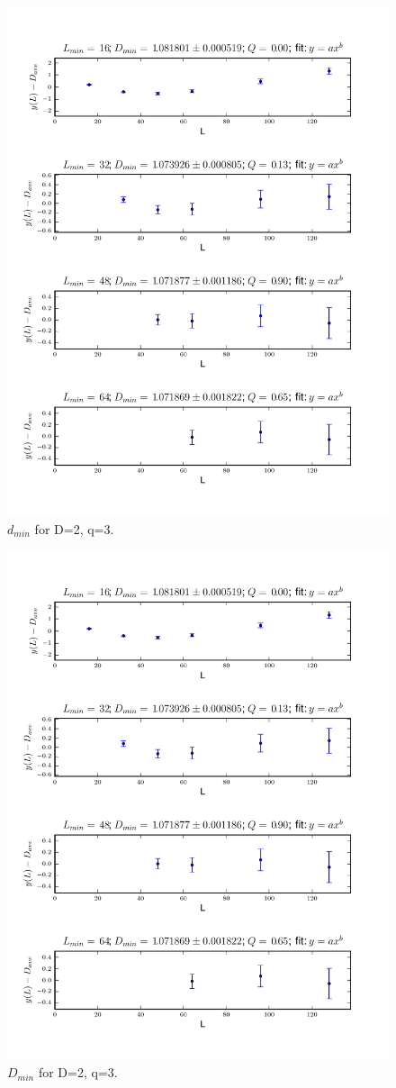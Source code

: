 \documentclass[pre,preprint]{revtex4}
\begin{document}

\begin{figure}[htp]
\centering
\includegraphics[width=.85\textwidth]{figures/d_min_D2q3_46_fig}
\caption{$d_{min}$ for D=2, q=3.}\label{fig:4}
\end{figure}


\begin{figure}[htp]
\centering
\includegraphics[width=.85\textwidth]{figures/D_min_D2q3_46_fig}
\caption{$D_{min}$ for D=2, q=3.}\label{fig:4}
\end{figure}
\end{document}
